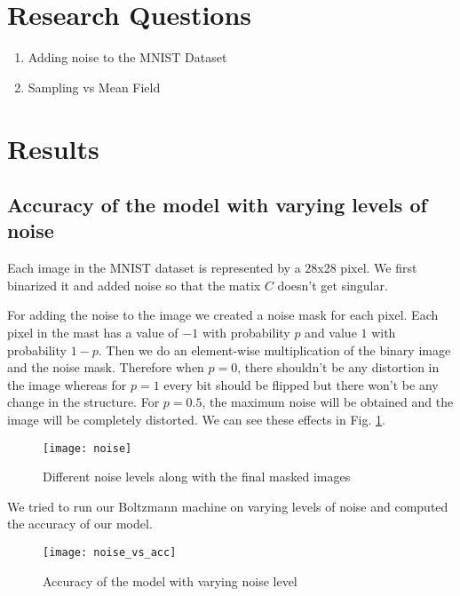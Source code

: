 \documentclass{article}
\begin{document}
\section{Research Questions}
\begin{enumerate}
  \item Adding noise to the MNIST Dataset
  \item Sampling vs Mean Field
\end{enumerate}

\section{Results}

\subsection{Accuracy of the model with varying levels of noise}
Each image in the MNIST dataset is represented by a 28x28 pixel. We first 
binarized it and added noise so that the matix $ C $ doesn't get singular.

For adding the noise to the image we created a noise mask for each pixel. Each
pixel in the mast has a value of $ -1 $ with probability $ p $ and value $ 1 $
with probability $ 1-p $. Then we do an element-wise multiplication of the 
binary image and the noise mask. Therefore when $ p=0 $, there shouldn't be any
distortion in the image whereas for $ p=1 $ every bit should be flipped but 
there won't be any change in the structure. For $ p=0.5 $, the maximum noise
will be obtained and the image will be completely distorted. We can see these
effects in Fig. \ref{fig:noise_level}.

\begin{figure}[h]
  \centering
  \texttt{[image: noise]}
  \caption{Different noise levels along with the final masked images}
  \label{fig:noise_level}
\end{figure}

We tried to run our Boltzmann machine on varying levels of noise and computed
the accuracy of our model.

\begin{figure}[h]
  \centering
  \texttt{[image: noise\_vs\_acc]}
  \caption{Accuracy of the model with varying noise level}
  \label{fig:noise_vs_acc}
\end{figure}
\end{document}
